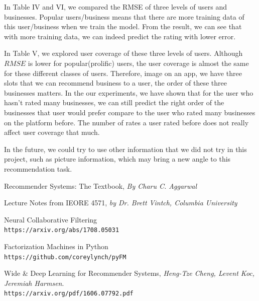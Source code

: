 \documentclass[journal]{IEEEtran}
\begin{document}
In Table IV and VI, we compared the RMSE of three levels of users and businesses. Popular users/business means that there are more training data of this user/business when we train the model. From the result, we can see that with more training data, we can indeed predict the rating with lower error. 

In Table V, we explored user coverage of these three levels of users. Although $RMSE$ is lower for popular(prolific) users, the user coverage is almost the same for these different classes of users. Therefore, image on an app, we have three slots that we can recommend business to a user, the order of these three businesses matters. In the our experiments, we have shown that for the user who hasn't rated many businesses, we can still predict the right order of the businesses that user would prefer compare to the user who rated many businesses on the platform before. The number of rates a user rated before does not really affect user coverage that much.

In the future, we could try to use other information that we did not try in this project, such as picture information, which may bring a new angle to this recommendation task.


\begin{thebibliography}{9}

Recommender Systems: The Textbook, \textit{By Charu C. Aggarwal} 

Lecture Notes from IEORE 4571,
\textit{ by Dr. Brett Vintch, Columbia University} 

Neural Collaborative Filtering
\\\texttt{https://arxiv.org/abs/1708.05031}

Factorization Machines in Python
\\\texttt{https://github.com/coreylynch/pyFM }

Wide \& Deep Learning for Recommender Systems, 
\textit{Heng-Tze Cheng, Levent Koc, Jeremiah Harmsen}. 
\\\texttt{https://arxiv.org/pdf/1606.07792.pdf}

\end{thebibliography}
\end{document}
